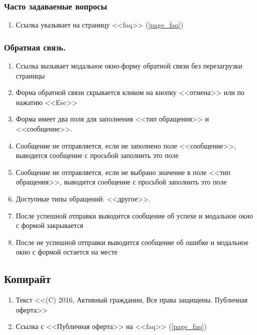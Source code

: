             \subsubsection{Часто задаваемые вопросы}
                \begin{enumerate}
                    \item Ссылка указывает на страницу <<faq>> (\ref{page_faq})
                \end{enumerate}
            \subsubsection{Обратная связь.}
                \begin{enumerate}
                    \item Ссылка вызывает модальное окно-форму обратной связи без перезагрузки страницы
                    \item Форма обратной связи скрывается кликом на кнопку <<отмена>> или по нажатию <<Esc>>
                    \item Форма имеет два поля для заполнения <<тип обращения>> и <<сообщение>>.
                    \item Сообщение не отправляется, если не заполнено поле <<сообщение>>, выводится сообщение с просьбой заполнить это поле
                    \item Сообщение не отправляется, если не выбрано значение в поле <<тип обращения>>, выводится сообщение с просьбой заполнить это поле
                    \item Доступные типы обращений: <<другое>>.
                    \item После успешной отправки выводится сообщение об успехе и модальное окно с формой закрывается
                    \item После не успешной отправки выводится сообщение об ошибке и модальное окно с формой остается на месте
                \end{enumerate}

        \subsection{Копирайт}
            \label{sec:baseitems_footer_copiright}
            \begin{enumerate}
                \item Текст <<(C) 2016, Активный гражданин, Все права защищены. Публичная оферта>>
                \item Ссылка с <<Публичная оферта>> на <<faq>> (\ref{page_faq})
            \end{enumerate}
